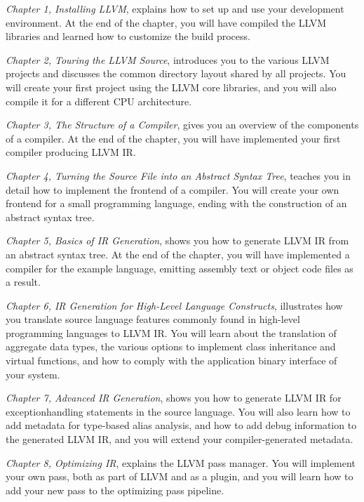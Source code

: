 \textit{Chapter 1, Installing LLVM}, explains how to set up and use your development environment. At the end of the chapter, you will have compiled the LLVM libraries and learned how to customize the build process.\par

\textit{Chapter 2, Touring the LLVM Source}, introduces you to the various LLVM projects and discusses the common directory layout shared by all projects. You will create your first project using the LLVM core libraries, and you will also compile it for a different CPU architecture.\par

\textit{Chapter 3, The Structure of a Compiler}, gives you an overview of the components of a compiler. At the end of the chapter, you will have implemented your first compiler producing LLVM IR.\par

\textit{Chapter 4, Turning the Source File into an Abstract Syntax Tree}, teaches you in detail how to implement the frontend of a compiler. You will create your own frontend for a small programming language, ending with the construction of an abstract syntax tree.\par

\textit{Chapter 5, Basics of IR Generation}, shows you how to generate LLVM IR from an abstract syntax tree. At the end of the chapter, you will have implemented a compiler for the example language, emitting assembly text or object code files as a result.\par

\textit{Chapter 6, IR Generation for High-Level Language Constructs}, illustrates how you translate source language features commonly found in high-level programming languages to LLVM IR. You will learn about the translation of aggregate data types, the various options to implement class inheritance and virtual functions, and how to comply with the application binary interface of your system.\par

\textit{Chapter 7, Advanced IR Generation}, shows you how to generate LLVM IR for exceptionhandling statements in the source language. You will also learn how to add metadata for type-based alias analysis, and how to add debug information to the generated LLVM IR, and you will extend your compiler-generated metadata.\par

\textit{Chapter 8, Optimizing IR}, explains the LLVM pass manager. You will implement your own pass, both as part of LLVM and as a plugin, and you will learn how to add your new pass to the optimizing pass pipeline.\par

